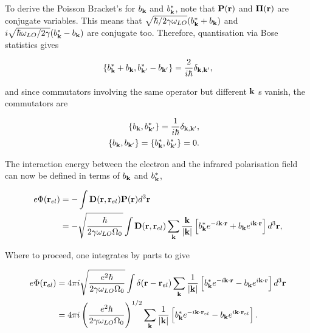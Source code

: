 To derive the Poisson Bracket's for $b_{\vb{k}}$ and $b_{\vb{k}}^*$, note that $\vb{P}(\vb{r})$ and $\vb{\Pi}(\vb{r})$ are conjugate variables. This means that $\sqrt{\hbar / 2\gamma \omega_{LO}} (b_{\vb{k}}^* + b_{\vb{k}})$ and  $i\sqrt{\hbar \omega_{LO} / 2\gamma} (b_{\vb{k}}^* - b_{\vb{k}})$ are conjugate too. Therefore, quantisation via Bose statistics gives

\begin{equation}
    \left\{b_{\vb{k}}^* + b_{\vb{k}}, b_{\vb{k'}}^* - b_{\vb{k'}}\right\} = \frac{2}{i\hbar} \delta_{\vb{k}, \vb{k'}},
\end{equation}

and since commutators involving the same operator but different $\vb{k}$ s vanish, the commutators are

\begin{subequations}
\begin{align}
    \begin{split}
        \left\{b_{\vb{k}},b^*_{\vb{k'}}\right\} &= \frac{1}{i\hbar} \delta_{\vb{k}, \vb{k'}},
    \end{split}\\
    \begin{split}
        \left\{b_{\vb{k}},b_{\vb{k'}}\right\} &= \left\{b^*_{\vb{k}},b^*_{\vb{k'}}\right\} = 0.
    \end{split}
\end{align}
\end{subequations}  

The interaction energy between the electron and the infrared polarisation field can now be defined in terms of $b_{\vb{k}}$ and $b^*_{\vb{k}}$,

\begin{equation}
    \begin{aligned}
    e \Phi (\vb{r}_{el}) &= - \int \vb{D}(\vb{r}, \vb{r}_{el}) \vb{P}(\vb{r}) d^3\vb{r} \\
    &= -\sqrt{\frac{\hbar}{2\gamma\omega_{LO}\Omega_0}} \int \vb{D}(\vb{r}, \vb{r}_{el}) \sum_{\vb{k}} \frac{\vb{k}}{\abs{\vb{k}}} \left[b_{\vb{k}}^* e^{-i\vb{k}\cdot\vb{r}} + b_{\vb{k}} e^{i\vb{k}\cdot\vb{r}} \right] d^3\vb{r},
    \end{aligned}
\end{equation}

Where to proceed, one integrates by parts to give

\begin{equation} \label{eqn:phi}
    \begin{aligned}
    e \Phi (\vb{r}_{el}) &= 4\pi i \sqrt{\frac{e^2 \hbar}{2\gamma\omega_{LO}\Omega_0}} \int \delta(\vb{r} - \vb{r}_{el}) \sum_{\vb{k}} \frac{1}{\abs{\vb{k}}} \left[b_{\vb{k}}^* e^{-i\vb{k}\cdot\vb{r}} - b_{\vb{k}} e^{i\vb{k}\cdot\vb{r}} \right] d^3\vb{r} \\
    &= 4\pi i \left( \frac{e^2 \hbar}{2 \gamma \omega_{LO} \Omega_0} \right)^{1/2} \sum_{\vb{k}} \frac{1}{\abs{\vb{k}}} \left[b_{\vb{k}}^* e^{-i\vb{k} \cdot \vb{r}_{el}} - b_{\vb{k}} e^{i\vb{k} \cdot \vb{r}_{el}}\right].
    \end{aligned}
\end{equation}

